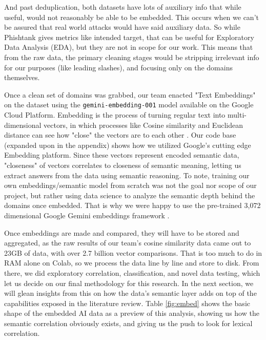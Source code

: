 \documentclass[conference]{IEEEtran}
\begin{document}
And past deduplication, both datasets have lots of auxiliary info that while useful, would not reasonably be able to be embedded. This occurs when we can't be assured that real world attacks would have said auxiliary data. So while Phishtank gives metrics like intended target, that can be useful for Exploratory Data Analysis (EDA), but they are not in scope for our work. This means that from the raw data, the primary cleaning stages would be stripping irrelevant info for our purposes (like leading slashes), and focusing only on the domains themselves.

Once a clean set of domains was grabbed, our team enacted "Text Embeddings" on the dataset using the \texttt{gemini-embedding-001} model available on the Google Cloud Platform.
Embedding is the process of turning regular text into multi-dimensional vectors, in which processes like Cosine similarity and Euclidean distance can see how "close" the vectors are to each other \cite{saidani1}.
Our code base (expanded upon in the appendix) shows how we utilized Google's cutting edge Embedding platform.
Since these vectors represent encoded semantic data, "closeness" of vectors correlates to closeness of semantic meaning, letting us extract answers from the data using semantic reasoning.
To note, training our own embeddings/semantic model from scratch was not the goal nor scope of our project, but rather using data science to analyze the semantic depth behind the domains once embedded. That is why we were happy to use the pre-trained 3,072 dimensional Google Gemini embeddings framework \cite{a2024_embeddings}.

Once embeddings are made and compared, they will have to be stored and aggregated, as the raw results of our team's cosine similarity data came out to 23GB of data, with over 2.7 billion vector comparisons. That is too much to do in RAM alone on Colab, so we process the data line by line and store to disk. From there, we did exploratory correlation, classification, and novel data testing, which let us decide on our final methodology for this research. In the next section, we will glean insights from this on how the data's semantic layer adds on top of the capabilities exposed in the literature review. Table \ref{fig:embed} shows the basic shape of the embedded AI data as a preview of this analysis, showing us how the semantic correlation obviously exists, and giving us the push to look for lexical correlation.
\end{document}
